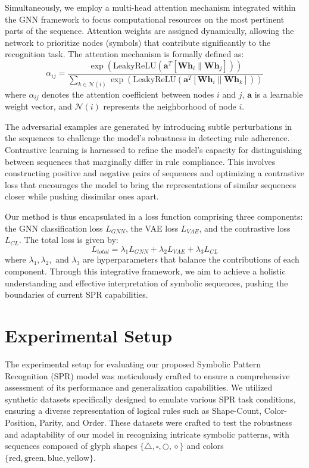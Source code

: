 \documentclass{article}
\begin{document}
Simultaneously, we employ a multi-head attention mechanism integrated within the GNN framework to focus computational resources on the most pertinent parts of the sequence. Attention weights are assigned dynamically, allowing the network to prioritize nodes (symbols) that contribute significantly to the recognition task. The attention mechanism is formally defined as:
\[ \alpha_{ij} = \frac{\exp(\text{LeakyReLU}(\mathbf{a}^T [\mathbf{W} \mathbf{h}_i \| \mathbf{W} \mathbf{h}_j]))}{\sum_{k \in \mathcal{N}(i)} \exp(\text{LeakyReLU}(\mathbf{a}^T [\mathbf{W} \mathbf{h}_i \| \mathbf{W} \mathbf{h}_k]))} \]
where \( \alpha_{ij} \) denotes the attention coefficient between nodes \( i \) and \( j \), \( \mathbf{a} \) is a learnable weight vector, and \( \mathcal{N}(i) \) represents the neighborhood of node \( i \).

The adversarial examples are generated by introducing subtle perturbations in the sequences to challenge the model’s robustness in detecting rule adherence. Contrastive learning is harnessed to refine the model’s capacity for distinguishing between sequences that marginally differ in rule compliance. This involves constructing positive and negative pairs of sequences and optimizing a contrastive loss that encourages the model to bring the representations of similar sequences closer while pushing dissimilar ones apart.

Our method is thus encapsulated in a loss function comprising three components: the GNN classification loss \( L_{GNN} \), the VAE loss \( L_{VAE} \), and the contrastive loss \( L_{CL} \). The total loss is given by:
\[ L_{total} = \lambda_1 L_{GNN} + \lambda_2 L_{VAE} + \lambda_3 L_{CL} \]
where \( \lambda_1, \lambda_2, \) and \( \lambda_3 \) are hyperparameters that balance the contributions of each component. Through this integrative framework, we aim to achieve a holistic understanding and effective interpretation of symbolic sequences, pushing the boundaries of current SPR capabilities.

\section{Experimental Setup}
The experimental setup for evaluating our proposed Symbolic Pattern Recognition (SPR) model was meticulously crafted to ensure a comprehensive assessment of its performance and generalization capabilities. We utilized synthetic datasets specifically designed to emulate various SPR task conditions, ensuring a diverse representation of logical rules such as Shape-Count, Color-Position, Parity, and Order. These datasets were crafted to test the robustness and adaptability of our model in recognizing intricate symbolic patterns, with sequences composed of glyph shapes \(\{ \triangle, \square, \bigcirc, \diamond \}\) and colors \(\{ \text{red}, \text{green}, \text{blue}, \text{yellow} \}\).
\end{document}
